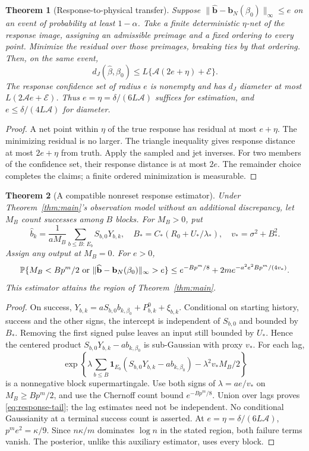 \documentclass[11pt,reqno]{amsart}
\newtheorem{theorem}{Theorem}[section]
\theoremstyle{remark}\newtheorem{remark}[theorem]{Remark}
\begin{document}
\begin{theorem}[Response-to-physical transfer]
\label{thm:transfer}
Suppose $\|\widehat{\mathbf b}-\mathbf b_N(\beta_0)\|_\infty\le e$ on
an event of probability at least $1-\alpha$. Take a finite deterministic
$\eta$-net of the response image, assigning an admissible preimage and a
fixed ordering to every point. Minimize the residual over those preimages,
breaking ties by that ordering. Then, on the same event,
\[
 d_J(\widehat\beta,\beta_0)\le L\{\mathcal A(2e+\eta)+\mathcal E\}.
\]
The response confidence set of radius $e$ is nonempty and has $d_J$ diameter
at most $L(2\mathcal A e+\mathcal E)$. Thus $e=\eta=\delta/(6L\mathcal A)$
suffices for estimation, and $e\le\delta/(4L\mathcal A)$ for diameter.
\end{theorem}
\begin{proof}
A net point within $\eta$ of the true response has residual at most $e+\eta$.
The minimizing residual is no larger. The triangle inequality gives response
distance at most $2e+\eta$ from truth. Apply the sampled and jet inverses.
For two members of the confidence set, their response distance is at most
$2e$. The remainder choice completes the claims; a finite ordered minimization
is measurable.
\end{proof}

\begin{theorem}[A compatible nonreset response estimator]
\label{thm:response-estimator}
Under Theorem~\ref{thm:main}'s observation model without an additional
discrepancy, let $M_B$ count successes among $B$ blocks. For $M_B>0$, put
\[
 \widehat b_k=\frac1{aM_B}\sum_{b\le B:\,E_b}S_{b,0}Y_{b,k},\quad
 B_*=C_*(R_0+U_*/\lambda_*),\quad v_*=\sigma^2+B_*^2.
\]
Assign any output at $M_B=0$. For $e>0$,
\begin{equation}
 \mathbb P\{M_B<Bp^m/2\ \hbox{or}\
 \|\widehat{\mathbf b}-\mathbf b_N(\beta_0)\|_\infty>e\}
 \le e^{-Bp^m/8}+2m e^{-a^2e^2Bp^m/(4v_*)}.
 \label{eq:response-tail}
\end{equation}
This estimator attains the region of Theorem~\ref{thm:main}.
\end{theorem}
\begin{proof}
On success, $Y_{b,k}=aS_{b,0}b_{k,\beta_0}+P^0_{b,k}+\xi_{b,k}$.
Conditional on starting history, success and the other signs, the intercept
is independent of $S_{b,0}$ and bounded by $B_*$. Removing the first signed
pulse leaves an input still bounded by $U_*$. Hence the centered product
$S_{b,0}Y_{b,k}-ab_{k,\beta_0}$ is sub-Gaussian with proxy $v_*$.
For each lag,
\[
 \exp\left\{\lambda\sum_{b\le B}\mathbf1_{E_b}
 (S_{b,0}Y_{b,k}-ab_{k,\beta_0})-\lambda^2v_*M_B/2\right\}
\]
is a nonnegative block supermartingale. Use both signs of $\lambda=ae/v_*$
on $M_B\ge Bp^m/2$, and use the Chernoff count bound $e^{-Bp^m/8}$.
Union over lags proves \eqref{eq:response-tail}; the lag estimates need not
be independent. No conditional Gaussianity at a terminal success count is
asserted. At $e=\eta=\delta/(6L\mathcal A)$, $p^me^2=\kappa/9$.
Since $n\kappa/m$ dominates $\log n$ in the stated region, both failure
terms vanish. The posterior, unlike this auxiliary estimator, uses every block.
\end{proof}
\end{document}
